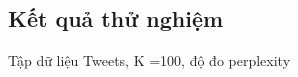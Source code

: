 \documentclass[pdf]{beamer}
\begin{document}
\subsection{Kết quả thử nghiệm}

\begin{frame}{Tập dữ liệu Tweets, K =100, độ đo perplexity}
\begin{columns}[T] %
	\begin{column}{.50\textwidth}
		\begin{figure}
		\end{figure}
	\end{column} %
	\hfill%
	\begin{column}{.50\textwidth}
		\begin{figure}

\end{figure}
\end{column}
\end{columns}
\end{frame}
\end{document}
